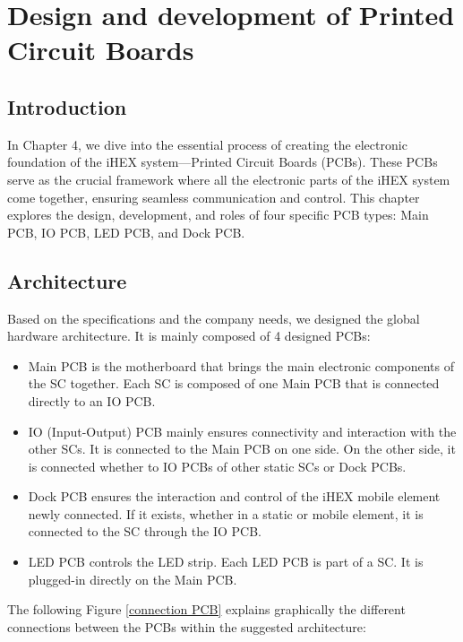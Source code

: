 \chapter{Design and development of Printed Circuit Boards}

\renewcommand{\chaptername}{Chapter}

\section*{Introduction}

In Chapter 4, we dive into the essential process of creating the electronic foundation of the iHEX system—Printed Circuit Boards (PCBs). These PCBs serve as the crucial framework where all the electronic parts of the iHEX system come together, ensuring seamless communication and control. This chapter explores the design, development, and roles of four specific PCB types: Main PCB, IO PCB, LED PCB, and Dock PCB.

\section{Architecture}

Based on the specifications and the company needs, we designed the global hardware architecture. It is mainly composed of 4 designed PCBs:

\begin{itemize}
    \item Main PCB is the motherboard that brings the main electronic components of the SC together. Each SC is composed of one Main PCB that is connected directly to an IO PCB.
    \item IO (Input-Output) PCB mainly ensures connectivity and interaction with the other SCs. It is connected to the Main PCB on one side. On the other side, it is connected whether to IO PCBs of other static SCs or Dock PCBs.
    \item Dock PCB ensures the interaction and control of the iHEX mobile element newly connected. If it exists, whether in a static or mobile element, it is connected to the SC through the IO PCB.
    \item LED PCB controls the LED strip. Each LED PCB is part of a SC. It is plugged-in directly on the Main PCB.
\end{itemize}

The following Figure \ref{connection PCB} explains graphically the different connections between the PCBs within the suggested architecture:

